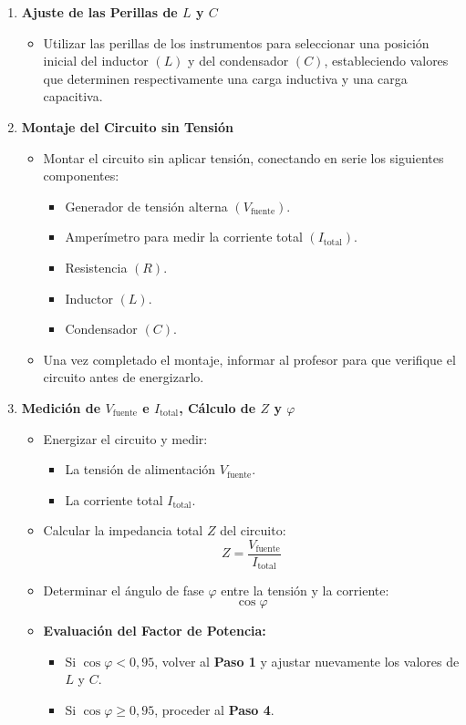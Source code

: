 \documentclass{article}
\begin{document}
\begin{enumerate}
    \item \textbf{Ajuste de las Perillas de $L$ y $C$}
    \begin{itemize}
        \item Utilizar las perillas de los instrumentos para seleccionar una posición inicial del inductor $(L)$ y del condensador $(C)$, estableciendo valores que determinen respectivamente una carga inductiva y una carga capacitiva.
    \end{itemize}

    \item \textbf{Montaje del Circuito sin Tensión}
    \begin{itemize}
        \item Montar el circuito sin aplicar tensión, conectando en serie los siguientes componentes:
        \begin{itemize}
            \item Generador de tensión alterna $(V_{\text{fuente}})$.
            \item Amperímetro para medir la corriente total $(I_{\text{total}})$.
            \item Resistencia $(R)$.
            \item Inductor $(L)$.
            \item Condensador $(C)$.
        \end{itemize}
        \item Una vez completado el montaje, informar al profesor para que verifique el circuito antes de energizarlo.
    \end{itemize}

    \item \textbf{Medición de $V_{\text{fuente}}$ e $I_{\text{total}}$, Cálculo de $Z$ y $\varphi$}
    \begin{itemize}
        \item Energizar el circuito y medir:
        \begin{itemize}
            \item La tensión de alimentación $V_{\text{fuente}}$.
            \item La corriente total $I_{\text{total}}$.
        \end{itemize}
        \item Calcular la impedancia total $Z$ del circuito:
        \[
        Z = \frac{V_{\text{fuente}}}{I_{\text{total}}}
        \]
        \item Determinar el ángulo de fase $\varphi$ entre la tensión y la corriente:
        \[
        \cos \varphi
        \]
        \item \textbf{Evaluación del Factor de Potencia:}
        \begin{itemize}
            \item Si $\cos \varphi < 0{,}95$, volver al \textbf{Paso 1} y ajustar nuevamente los valores de $L$ y $C$.
            \item Si $\cos \varphi \geq 0{,}95$, proceder al \textbf{Paso 4}.
        \end{itemize}
    \end{itemize}


\end{enumerate}
\end{document}
